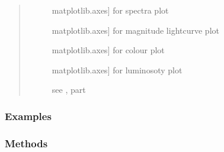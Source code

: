 \documentclass[letterpaper,10pt,english]{sphinxmanual}
\begin{document}
\begin{fulllineitems}
\begin{fulllineitems}
\begin{quote}
\begin{description}
\begin{description}
\item[{}] \leavevmode{[}matplotlib.axes{]}
for spectra plot

\item[{}] \leavevmode{[}matplotlib.axes{]}
for magnitude lightcurve plot

\item[{}] \leavevmode{[}matplotlib.axes{]}
for colour plot

\item[{}] \leavevmode{[}matplotlib.axes{]}
for luminosoty plot

\item[{}] \leavevmode{[}\sphinxtitleref{Keyword Arguments}{]}
see ,
 part

\end{description}

\end{description}\end{quote}
\subsubsection*{Examples}

\begin{sphinxVerbatim}[commandchars=\\\{\}]
   
  
\end{sphinxVerbatim}

\end{fulllineitems}

\subsubsection*{Methods}


\begin{savenotes}\sphinxatlongtablestart\begin{longtable}[c]{}
\hline

\endfirsthead


\end{longtable}
\end{savenotes}
\end{fulllineitems}
\end{document}
